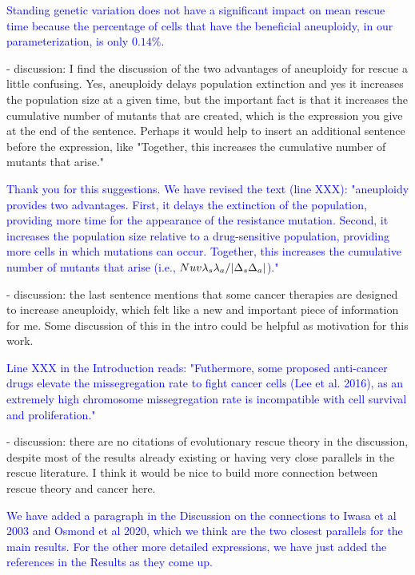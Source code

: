 \documentclass[12pt]{extarticle}
\begin{document}
\textcolor{blue}{Standing genetic variation does not have a significant impact on mean rescue time because the percentage of cells that have the beneficial aneuploidy, in our parameterization, is only $0.14\%$.} 

- discussion: I find the discussion of the two advantages of aneuploidy for rescue a little confusing. Yes, aneuploidy delays population extinction and yes it increases the population size at a given time, but the important fact is that it increases the cumulative number of mutants that are created, which is the expression you give at the end of the sentence. Perhaps it would help to insert an additional sentence before the expression, like "Together, this increases the cumulative number of mutants that arise."

\textcolor{blue}{%
Thank you for this suggestions. We have revised the text (line XXX): "aneuploidy provides two advantages. First, it delays the extinction of the population, providing more time for the appearance of the resistance mutation. Second, it increases the population size relative to a drug-sensitive population, providing more cells in which mutations can occur. Together, this increases the cumulative number of mutants that arise (i.e., $Nuv\lambda_s\lambda_a/\abs{\Delta_s\Delta_a}$)."
} 

- discussion: the last sentence mentions that some cancer therapies are designed to increase aneuploidy, which felt like a new and important piece of information for me. Some discussion of this in the intro could be helpful as motivation for this work.

\textcolor{blue}{%
Line XXX in the Introduction reads: "Futhermore, some proposed anti-cancer drugs elevate the missegregation rate to fight cancer cells (Lee et al. 2016), as an extremely high chromosome missegregation rate is incompatible with cell survival and proliferation."
} 

- discussion: there are no citations of evolutionary rescue theory in the discussion, despite most of the results already existing or having very close parallels in the rescue literature. I think it would be nice to build more connection between rescue theory and cancer here.

\textcolor{blue}{We have added a paragraph in the Discussion on the connections to Iwasa et al 2003 and Osmond et al 2020, which we think are the two closest parallels for the main results. 
For the other more detailed expressions, we have just added the references in the Results as they come up.} 
\end{document}
